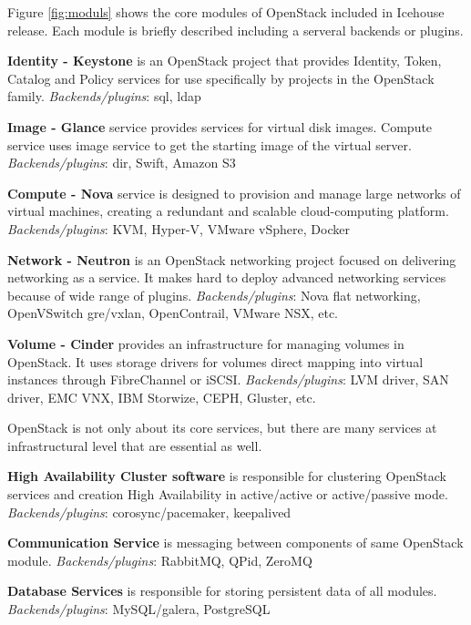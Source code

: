Figure \ref{fig:moduls} shows the core modules of OpenStack included in Icehouse release. Each module is briefly described including a serveral backends or plugins.





\textbf{Identity - Keystone} is an OpenStack project that provides Identity, Token, Catalog and Policy services for use specifically by projects in the OpenStack family. 
\textit{Backends/plugins}: sql, ldap

\textbf{Image - Glance} service provides services for virtual disk images. Compute service uses image service to get the starting image of the virtual server.
\textit{Backends/plugins}: dir, Swift, Amazon S3

\textbf{Compute - Nova} service is designed to provision and manage large networks of virtual machines, creating a redundant and scalable cloud-computing platform. 
\textit{Backends/plugins}: KVM, Hyper-V, VMware vSphere, Docker

\textbf{Network - Neutron} is an OpenStack networking project focused on delivering networking as a service. It makes hard to deploy advanced networking services because of wide range of plugins.
\textit{Backends/plugins}: Nova flat networking, OpenVSwitch gre/vxlan, OpenContrail, VMware NSX, etc.

\textbf{Volume - Cinder} provides an infrastructure for managing volumes in OpenStack. It uses storage drivers for volumes direct mapping into virtual instances through FibreChannel or iSCSI. 
\textit{Backends/plugins}: LVM driver, SAN driver, EMC VNX, IBM Storwize, CEPH, Gluster, etc.

OpenStack is not only about its core services, but there are many services at infrastructural level that are essential as well.

\textbf{High Availability Cluster software} is responsible for clustering OpenStack services and creation High Availability in active/active or active/passive mode.
\textit{Backends/plugins}: corosync/pacemaker, keepalived

\textbf{Communication Service} is messaging between components of same OpenStack module.
\textit{Backends/plugins}: RabbitMQ, QPid, ZeroMQ

\textbf{Database Services} is responsible for storing persistent data of all modules.
\textit{Backends/plugins}: MySQL/galera, PostgreSQL

